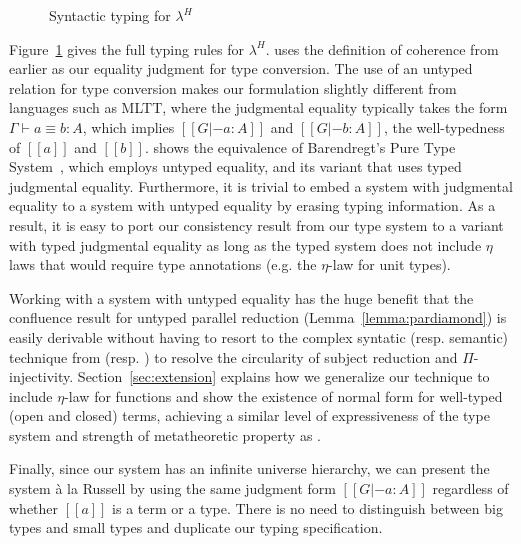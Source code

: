 \documentclass[acmsmall]{acmart}
\newcommand{\lang}{$\lambda^H$\xspace}
\begin{document}
\begin{figure}[ht]
\begin{minipage}{0.9\textwidth}
\end{minipage}
\caption{Syntactic typing for \lang}
\label{fig:typing}
\end{figure}

Figure~\ref{fig:typing} gives the full typing rules for
\lang{}.  uses the definition of coherence from earlier
as our equality judgment for type conversion. The use of an untyped
relation for type conversion makes our formulation slightly different
from languages such as MLTT, where the judgmental equality typically
takes the form $\Gamma \vdash a \equiv b : A$, which implies $[[G |- a :
A]]$ and $[[G |- b : A]]$, the well-typedness of $[[a]]$ and $[[b]]$.
\citet{siles2012pure} shows the equivalence of Barendregt's
Pure Type System~\citep{barendregt1991introduction}, which employs
untyped equality, and its variant that uses typed judgmental
equality. Furthermore, it is trivial to embed a system with judgmental
equality to a system with untyped equality by erasing typing
information. As a result, it is easy to port our consistency result from our
type system to a variant with typed judgmental equality
as long as the typed system does not include $\eta$ laws
that would require type annotations (e.g. the $\eta$-law for unit
types). %

Working with a system with untyped equality has the huge benefit that
the confluence result for untyped parallel reduction
(Lemma~\ref{lemma:pardiamond}) is easily derivable without having to
resort to the complex syntatic (resp. semantic) technique from
\citet{siles2012pure} (resp. \citet{decagda}) to resolve
the circularity of subject reduction and $\Pi$-injectivity.
Section~\ref{sec:extension} explains how we
generalize our technique to include $\eta$-law for functions and
show the existence of normal form for well-typed (open and closed)
terms, achieving a similar level of expressiveness of the type system
and strength of metatheoretic property as \citet{decagda}.

Finally, since our system has an infinite universe hierarchy, we can
present the system à la Russell by using the same judgment form $[[G
|- a : A]]$ regardless of whether $[[a]]$ is a term or a type. There
is no need to distinguish between big types and small types
and duplicate our typing specification.
\end{document}
